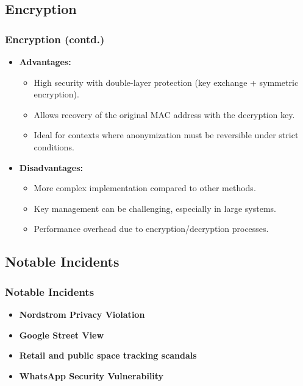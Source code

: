 \documentclass[
english,
svgnames,
notes=hide,
12pt]{beamer}
\begin{document}
\begin{frame}
  \section{Encryption}
  \frametitle{Encryption (contd.)}
  \begin{itemize}
    \item \textbf{Advantages:} \pause
      \begin{itemize}
        \item High security with double-layer protection (key exchange + symmetric encryption). \pause
        \item Allows recovery of the original MAC address with the decryption key. \pause
        \item Ideal for contexts where anonymization must be reversible under strict conditions. \pause
      \end{itemize}
    \item \textbf{Disadvantages:} \pause
      \begin{itemize}
        \item More complex implementation compared to other methods. \pause
        \item Key management can be challenging, especially in large systems. \pause
        \item Performance overhead due to encryption/decryption processes. 
      \end{itemize}
  \end{itemize}
\end{frame}

\begin{frame}
  \section{Notable Incidents}
  \frametitle{Notable Incidents}
  \begin{itemize}
    \item \textbf{Nordstrom Privacy Violation} \pause
    \item \textbf{Google Street View} \pause
    \item \textbf{Retail and public space tracking scandals} \pause
    \item \textbf{WhatsApp Security Vulnerability} 
  \end{itemize}
\end{frame}
\end{document}
